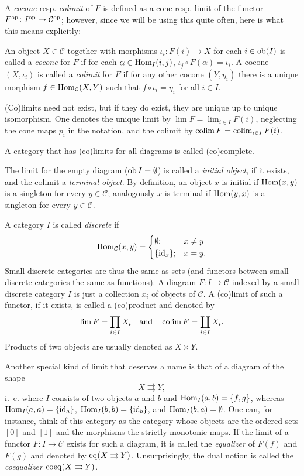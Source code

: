 \documentclass[a4paper,openany]{scrbook}
\renewcommand{\C}{\mathcal C}
\begin{document}
A \emph{cocone} resp. \emph{colimit} of $F$ is defined as a cone resp. limit of the functor $F^\op\colon I^\op \to \C^\op$; however, since we will be using this quite often, here is what this means explicitly:

\begin{defn} An object $X \in \C$ together with morphisms $\iota_i\colon F(i) \to X$ for each $i \in \operatorname{ob}(I)$ is called a \emph{cocone} for $F$ if for each $\alpha \in \operatorname{Hom}_I(i,j)$, $\iota_j \circ F(\alpha) = \iota_i$. A cocone $(X,\iota_i)$ is called a \emph{colimit} for $F$ if for any other cocone $(Y,\eta_i)$ there is a unique morphism $f \in \Hom_\C(X,Y)$ such that $f \circ \iota_i = \eta_i$ for all $i \in I$.
\end{defn}

(Co)limits need not exist, but if they do exist, they are unique up to unique isomorphism. One denotes the unique limit by $\lim F = \lim_{i \in I} F(i)$, neglecting the cone maps $p_i$ in the notation, and the colimit by $\operatorname*{colim} F = \operatorname*{colim}_{i \in I} F(i)$.

A category that has (co)limits for all diagrams is called (co)complete.

The limit for the empty diagram ($\operatorname{ob} I = \emptyset$) is called a \emph{initial object}, if it exists, and the colimit a \emph{terminal object}. By definition, an object $x$ is initial if $\operatorname{Hom}(x,y)$ is a singleton for every $y \in \C$; analogously $x$ is terminal if $\operatorname{Hom}(y,x)$ is a singleton for every $y \in \C$.

A category $I$ is called \emph{discrete} if 
\[
\Hom_\C(x,y) =\begin{cases} \emptyset; & x \neq y\\ \{\id_x\}; & x = y.\end{cases}
\]
Small discrete categories are thus the same as sets (and functors between small discrete categories the same as functions). A diagram $F\colon I \to \C$ indexed by a small discrete category $I$ is just a collection $x_i$ of objects of $\C$. A (co)limit of such a functor, if it exists, is called a (co)product and denoted by
\[
\lim F = \prod_{i \in I} X_i \quad\text{and}\quad \operatorname*{colim} F = \coprod_{i \in I} X_i.
\]
Products of two objects are usually denoted as $X \times Y$.

Another special kind of limit that deserves a name is that of a diagram of the shape
\[
X \rightrightarrows Y,
\]
i.~e. where $I$ consists of two objects $a$ and $b$ and $\operatorname{Hom}_I(a,b) = \{f,g\}$, whereas $\operatorname{Hom}_I(a,a) = \{\operatorname{id}_a\}$, $\operatorname{Hom}_I(b,b) = \{\operatorname{id}_b\}$, and $\operatorname{Hom}_I(b,a) = \emptyset$. One can, for instance, think of this category as the category whose objects are the ordered sets $[0]$ and $[1]$ and the morphisms the strictly monotonic maps. If the limit of a functor $F\colon I \to \C$ exists for such a diagram, it is called the \emph{equalizer} of $F(f)$ and $F(g)$ and denoted by $\operatorname{eq}(X \rightrightarrows Y)$. Unsurprisingly, the dual notion is called the \emph{coequalizer} $\operatorname{coeq}(X \rightrightarrows Y)$.
\end{document}
